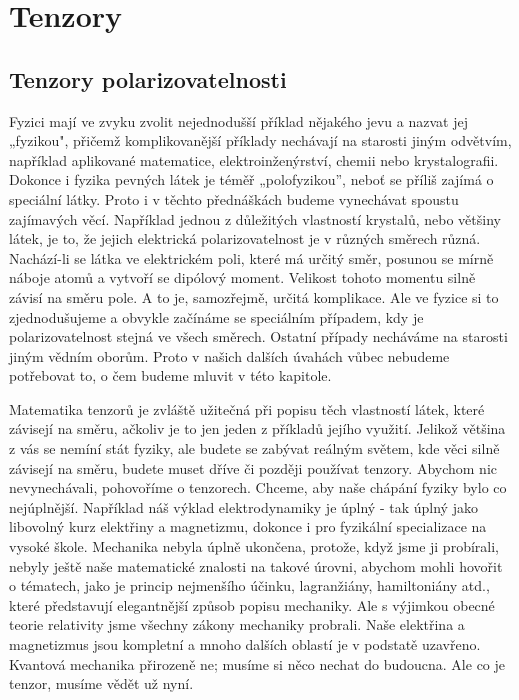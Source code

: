 \setchaptertoc
\chapter{Tenzory}\label{fyz:IIchapXXXI}

  \section{Tenzory polarizovatelnosti}\label{fyz:IIchapXXXIsecI}
    Fyzici mají ve zvyku zvolit nejednodušší příklad nějakého jevu a nazvat jej „fyzikou", přičemž
    komplikovanější příklady nechávají na starosti jiným odvětvím, například aplikované matematice,
    elektroinženýrství, chemii nebo krystalografii. Dokonce i fyzika pevných látek je téměř
    „polofyzikou”, neboť se příliš zajímá o speciální látky. Proto i v těchto přednáškách budeme
    vynechávat spoustu zajímavých věcí. Například jednou z důležitých vlastností krystalů, nebo
    většiny látek, je to, že jejich elektrická polarizovatelnost je v různých směrech různá.
    Nachází-li se látka ve elektrickém poli, které má určitý směr, posunou se mírně náboje atomů a
    vytvoří se dipólový moment. Velikost tohoto momentu silně závisí na směru pole. A to je,
    samozřejmě, určitá komplikace. Ale ve fyzice si to zjednodušujeme a obvykle začínáme se
    speciálním případem, kdy je polarizovatelnost stejná ve všech směrech. Ostatní případy necháváme
    na starosti jiným vědním oborům. Proto v našich dalších úvahách vůbec nebudeme potřebovat to, o
    čem budeme mluvit v této kapitole.
    
    Matematika tenzorů je zvláště užitečná při popisu těch vlastností látek, které závisejí na
    směru, ačkoliv je to jen jeden z příkladů jejího využití. Jelikož většina z vás se nemíní stát
    fyziky, ale budete se zabývat reálným světem, kde věci silně závisejí na směru, budete muset
    dříve či později používat tenzory. Abychom nic nevynechávali, pohovoříme o tenzorech. Chceme,
    aby naše chápání fyziky bylo co nejúplnější. Například náš výklad elektrodynamiky je úplný - tak
    úplný jako libovolný kurz elektřiny a magnetizmu, dokonce i pro fyzikální specializace na vysoké
    škole. Mechanika nebyla úplně ukončena, protože, když jsme ji probírali, nebyly ještě naše
    matematické znalosti na takové úrovni, abychom mohli hovořit o tématech, jako je princip
    nejmenšího účinku, lagranžiány, hamiltoniány atd., které představují elegantnější způsob popisu
    mechaniky. Ale s výjimkou obecné teorie relativity jsme všechny zákony mechaniky probrali. Naše
    elektřina a magnetizmus jsou kompletní a mnoho dalších oblastí je v podstatě uzavřeno. Kvantová
    mechanika přirozeně ne; musíme si něco nechat do budoucna. Ale co je tenzor, musíme vědět už
    nyní. 

